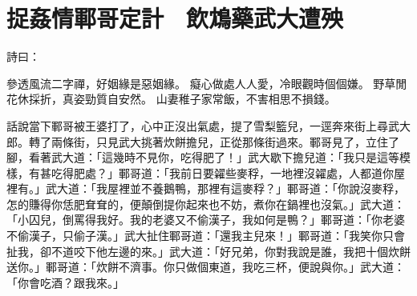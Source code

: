 %

\chapter{捉姦情鄆哥定計　飲鴆藥武大遭殃}

\begin{showcontents}{}


詩曰：

參透風流二字禪，好姻緣是惡姻緣。
癡心做處人人愛，冷眼觀時個個嫌。
野草閒花休採折，真姿勁質自安然。
山妻稚子家常飯，不害相思不損錢。

話說當下鄆哥被王婆打了，心中正沒出氣處，提了雪梨籃兒，一逕奔來街上尋武大郎。轉了兩條街，只見武大挑著炊餅擔兒，正從那條街過來。鄆哥見了，立住了腳，看著武大道：「這幾時不見你，吃得肥了！」武大歇下擔兒道：「我只是這等模樣，有甚吃得肥處？」鄆哥道：「我前日要糴些麥稃，一地裡沒糴處，人都道你屋裡有。」武大道：「我屋裡並不養鵝鴨，那裡有這麥稃？」鄆哥道：「你說沒麥稃，怎的賺得你恁肥耷耷的，便顛倒提你起來也不妨，煮你在鍋裡也沒氣。」武大道：「小囚兒，倒罵得我好。我的老婆又不偷漢子，我如何是鴨？」鄆哥道：「你老婆不偷漢子，只偷子漢。」武大扯住鄆哥道：「還我主兒來！」鄆哥道：「我笑你只會扯我，卻不道咬下他左邊的來。」武大道：「好兄弟，你對我說是誰，我把十個炊餅送你。」鄆哥道：「炊餅不濟事。你只做個東道，我吃三杯，便說與你。」武大道：「你會吃酒？跟我來。」


\end{showcontents}
